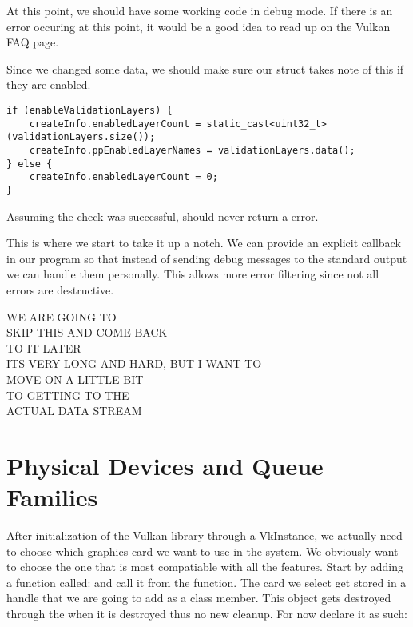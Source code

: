 \par At this point, we should have some working code in debug mode. If there is an error occuring at this point, it would be a good idea to read up on the Vulkan FAQ page. 
\par Since we changed some data, we should make sure our  struct takes note of this if they are enabled.

\begin{center}
    \begin{minipage}{0.95\linewidth}
\begin{lstlisting}
if (enableValidationLayers) {
    createInfo.enabledLayerCount = static_cast<uint32_t>(validationLayers.size());
    createInfo.ppEnabledLayerNames = validationLayers.data();
} else {
    createInfo.enabledLayerCount = 0;
}
\end{lstlisting}
\end{minipage}
\end{center}

\par Assuming the check was successful,  should never return a  error.

\par This is where we start to take it up a notch. We can provide an explicit callback in our program so that instead of sending debug messages to the standard output we can handle them personally. This allows more error filtering since not all errors are destructive.


\Huge WE ARE GOING TO \\ SKIP THIS AND COME BACK \\ TO IT LATER \\ 
ITS VERY LONG AND HARD, BUT I WANT TO \\  MOVE ON A LITTLE BIT\\ 
TO GETTING TO THE\\  ACTUAL DATA STREAM


\section*{Physical Devices and Queue Families}
\normalsize
\par After initialization of the Vulkan library through a VkInstance, we actually need to choose which graphics card we want to use in the system. We obviously want to choose the one that is most compatiable with all the features. Start by adding a function called:  and call it from the  function. The card we select get stored in a  handle that we are going to add as a class member. This object gets destroyed through the  when it is destroyed thus no new cleanup. For now declare it as such:

